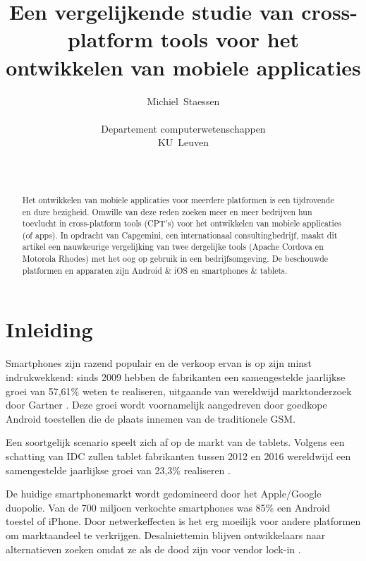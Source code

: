 \documentclass[a4paper]{IEEEconf}
\newcommand{\citeGartner}{\cite{Gartner:08Q2, Gartner:08Q3, Gartner:08Q4, Gartner:10Q1, Gartner:10Q2, Gartner:10Q3, Gartner:10Q4, Gartner:11Q1, Gartner:11Q2, Gartner:11Q3, Gartner:11Q4, Gartner:12Q1, Gartner:12Q2, Gartner:12Q3, Gartner:12Q4, Gartner:13Q1}}
\begin{document}
\title{Een vergelijkende studie van cross-platform tools voor het ontwikkelen van mobiele applicaties}
\author{
    Michiel~Staessen \\
    \begin{affiliation}
       Departement computerwetenschappen\\
       KU~Leuven\\
    \end{affiliation} \\
}
\maketitle

\begin{abstract}
    Het ontwikkelen van mobiele applicaties voor meerdere platformen is een tijdrovende en dure bezigheid. Omwille van deze reden zoeken meer en meer bedrijven hun toevlucht in cross-platform tools (CPT's) voor het ontwikkelen van mobiele applicaties (of apps). In opdracht van Capgemini, een internationaal consultingbedrijf, maakt dit artikel een nauwkeurige vergelijking van twee dergelijke tools (Apache Cordova en Motorola Rhodes) met het oog op gebruik in een bedrijfsomgeving. De beschouwde platformen en apparaten zijn Android \& iOS en smartphones \& tablets.
\end{abstract}

\section{Inleiding}

Smartphones zijn razend populair en de verkoop ervan is op zijn minst indrukwekkend: sinds 2009 hebben de fabrikanten een samengestelde jaarlijkse groei van 57,61\% weten te realiseren, uitgaande van wereldwijd marktonderzoek door Gartner \citeGartner. Deze groei wordt voornamelijk aangedreven door goedkope Android toestellen die de plaats innemen van de traditionele GSM. 

Een soortgelijk scenario speelt zich af op de markt van de tablets. Volgens een schatting van IDC zullen tablet fabrikanten tussen 2012 en 2016 wereldwijd een samengestelde jaarlijkse groei van 23,3\% realiseren \cite{IDC:tablet}.

De huidige smartphonemarkt wordt gedomineerd door het Apple/Google duopolie. Van de 700 miljoen verkochte smartphones was 85\% een Android toestel of iPhone. Door netwerkeffecten is het erg moeilijk voor andere platformen om marktaandeel te verkrijgen. Desalniettemin blijven ontwikkelaars naar alternatieven zoeken omdat ze als de dood zijn voor vendor lock-in \cite{VMDE:2013}.
\end{document}

